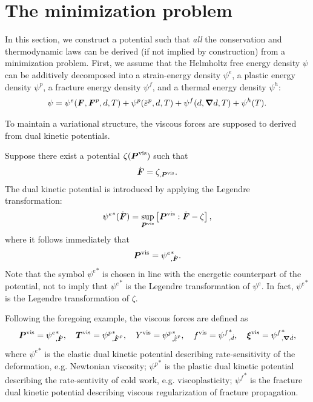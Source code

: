 \section{The minimization problem}
\label{section: Chapter2/minimization}

In this section, we construct a potential such that \emph{all} the conservation and thermodynamic laws can be derived (if not implied by construction) from a minimization problem. First, we assume that the Helmholtz free energy density $\psi$ can be additively decomposed into a strain-energy density $\psi^e$, a plastic energy density $\psi^p$, a fracture energy density $\psi^f$, and a thermal energy density $\psi^h$:
\begin{align}
  \psi = \psi^e(\defgrad, \defgrad^p, d, T) + \psi^p(\ep, d, T) + \psi^f(d, \grad d, T) + \psi^h(T). \label{eq: energies}
\end{align}

To maintain a variational structure, the viscous forces are supposed to derived from dual kinetic potentials.

\begin{example}
  \vspace{-0.5em}
  Suppose there exist a potential $\zeta(\boldsymbol{P}^\text{vis})$ such that
  \begin{align}
    \dot{\boldsymbol{F}} = \zeta_{,\boldsymbol{P}^\text{vis}}.
  \end{align}
  The dual kinetic potential is introduced by applying the Legendre transformation:
  \begin{align}
    {\psi^e}^*(\dot{\boldsymbol{F}}) = \sup_{\boldsymbol{P}^\text{vis}}\left[ \boldsymbol{P}^\text{vis}:\dot{\boldsymbol{F}} - \zeta \right],
  \end{align}
  where it follows immediately that
  \begin{align}
    \boldsymbol{P}^\text{vis} = {\psi^e}^*_{,\dot{\boldsymbol{F}}}.
  \end{align}
  Note that the symbol ${\psi^e}^*$ is chosen in line with the energetic counterpart of the potential, not to imply that ${\psi^e}^*$ is the Legendre transformation of $\psi^e$. In fact, ${\psi^e}^*$ is the Legendre transformation of $\zeta$.
\end{example}

Following the foregoing example, the viscous forces are defined as
\begin{align}
  \bfP^\text{vis} = {\psi^e}^*_{,\dot{\defgrad}}, \quad \bfT^\text{vis} = {\psi^p}^*_{,\dot{\defgrad}^p}, \quad Y^\text{vis} = {\psi^p}^*_{,\epdot}, \quad f^\text{vis} = {\psi^f}^*_{,\dot{d}}, \quad \bs{\xi}^\text{vis} = {\psi^f}^*_{,\grad\dot{d}},
\end{align}
where ${\psi^e}^*$ is the elastic dual kinetic potential describing rate-sensitivity of the deformation, e.g. Newtonian viscosity; ${\psi^p}^*$ is the plastic dual kinetic potential describing the rate-sentivity of cold work, e.g. viscoplasticity; ${\psi^f}^*$ is the fracture dual kinetic potential describing viscous regularization of fracture propagation.

